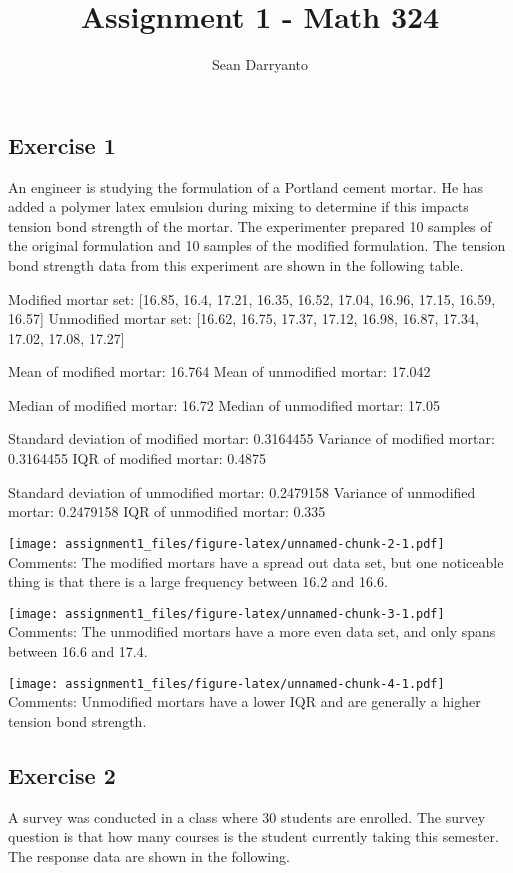 \documentclass[]{article}
\title{Assignment 1 - Math 324}
\author{Sean Darryanto}
\date{}
\begin{document}
\maketitle

\subsection{Exercise 1}\label{exercise-1}

An engineer is studying the formulation of a Portland cement mortar. He
has added a polymer latex emulsion during mixing to determine if this
impacts tension bond strength of the mortar. The experimenter prepared
10 samples of the original formulation and 10 samples of the modified
formulation. The tension bond strength data from this experiment are
shown in the following table.

Modified mortar set: {[}16.85, 16.4, 17.21, 16.35, 16.52, 17.04, 16.96,
17.15, 16.59, 16.57{]} Unmodified mortar set: {[}16.62, 16.75, 17.37,
17.12, 16.98, 16.87, 17.34, 17.02, 17.08, 17.27{]}

Mean of modified mortar: 16.764 Mean of unmodified mortar: 17.042

Median of modified mortar: 16.72 Median of unmodified mortar: 17.05

Standard deviation of modified mortar: 0.3164455 Variance of modified
mortar: 0.3164455 IQR of modified mortar: 0.4875

Standard deviation of unmodified mortar: 0.2479158 Variance of
unmodified mortar: 0.2479158 IQR of unmodified mortar: 0.335

\texttt{[image: assignment1\_files/figure-latex/unnamed-chunk-2-1.pdf]}
Comments: The modified mortars have a spread out data set, but one
noticeable thing is that there is a large frequency between 16.2 and
16.6.

\texttt{[image: assignment1\_files/figure-latex/unnamed-chunk-3-1.pdf]}
Comments: The unmodified mortars have a more even data set, and only
spans between 16.6 and 17.4.

\texttt{[image: assignment1\_files/figure-latex/unnamed-chunk-4-1.pdf]}
Comments: Unmodified mortars have a lower IQR and are generally a higher
tension bond strength.

\subsection{Exercise 2}\label{exercise-2}

A survey was conducted in a class where 30 students are enrolled. The
survey question is that how many courses is the student currently taking
this semester. The response data are shown in the following.
\end{document}
